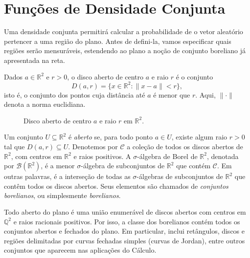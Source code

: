 \documentclass[12pt,portuguese]{article}
\theoremstyle{definition}
\theoremstyle{plainexercise}
\theoremstyle{starredexercise}
\theoremstyle{definition}
\begin{document}
\section{Funções de Densidade Conjunta}\label{sec:densidade-conjunta}
Uma densidade conjunta permitirá calcular a probabilidade de o vetor
aleatório pertencer a uma região do plano. Antes de defini-la, vamos
especificar quais regiões serão mensuráveis, estendendo ao plano a noção
de conjunto boreliano já apresentada na reta.

Dados $a \in \mathbb{R}^2$ e $r > 0$, o disco aberto de centro $a$ e raio
$r$ é o conjunto
\[
  D(a,r) = \{x \in \mathbb{R}^2 : \|x-a\| < r\},
\]
isto é, o conjunto dos pontos cuja distância até $a$ é menor que $r$.
Aqui, $\|\cdot\|$ denota a norma euclidiana.
\begin{figure}[H]
\centering
{}
\caption{Disco aberto de centro $a$ e raio $r$ em $\mathbb{R}^2$.}
\label{fig:disco-aberto}
\end{figure}
Um conjunto $U \subseteq \mathbb{R}^2$ é \emph{aberto} se, para todo ponto
$a \in U$, existe algum raio $r > 0$ tal que $D(a,r) \subseteq U$.
Denotemos por $\mathscr{C}$ a coleção de todos os discos abertos de
$\mathbb{R}^2$, com centros em $\mathbb{R}^2$ e raios positivos.
A $\sigma$-álgebra de Borel de
$\mathbb{R}^2$, denotada por $\mathscr{B}(\mathbb{R}^2)$, é a menor
$\sigma$-álgebra de subconjuntos de $\mathbb{R}^2$ que contém $\mathscr{C}$. Em
outras palavras, é a interseção de todas as $\sigma$-álgebras de subconjuntos
de $\mathbb{R}^2$ que contêm todos os discos abertos. Seus elementos são
chamados de \emph{conjuntos borelianos}, ou simplesmente \emph{borelianos}.

Todo aberto do plano é uma união enumerável de discos abertos com centros
em $\mathbb{Q}^2$ e raios racionais positivos. Por isso, a classe dos
borelianos contém todos os conjuntos abertos e fechados do plano. Em
particular, inclui retângulos, discos e regiões delimitadas por curvas
fechadas simples (curvas de Jordan), entre outros conjuntos que aparecem
nas aplicações do Cálculo.
\end{document}
